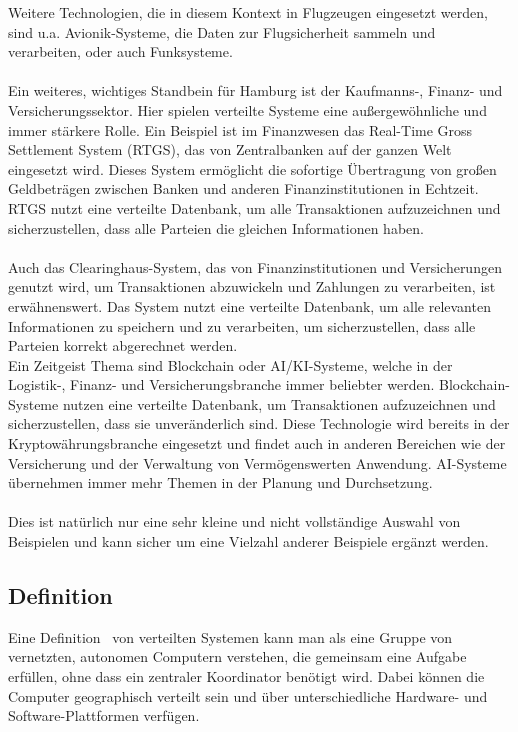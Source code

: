 \documentclass[../vs-script-first-v01.tex]{subfiles}
\begin{document}
Weitere Technologien, die in diesem Kontext in Flugzeugen eingesetzt werden, sind u.a. Avionik-Systeme, die Daten zur Flugsicherheit sammeln und verarbeiten, oder auch Funksysteme.
\\\\
Ein weiteres, wichtiges Standbein für Hamburg ist der Kaufmanns-, Finanz- und Versicherungssektor. Hier spielen verteilte Systeme eine außergewöhnliche und immer stärkere Rolle. Ein Beispiel ist im Finanzwesen das Real-Time Gross Settlement System (RTGS)\cite{rtgs}, das von Zentralbanken auf der ganzen Welt eingesetzt wird. Dieses System ermöglicht die sofortige Übertragung von großen Geldbeträgen zwischen Banken und anderen Finanzinstitutionen in Echtzeit. RTGS nutzt eine verteilte Datenbank, um alle Transaktionen aufzuzeichnen und sicherzustellen, dass alle Parteien die gleichen Informationen haben.
\\\\
Auch das Clearinghaus-System\cite{clearinghouse}, das von Finanzinstitutionen und Versicherungen genutzt wird, um Transaktionen abzuwickeln und Zahlungen zu verarbeiten, ist erwähnenswert. Das System nutzt eine verteilte Datenbank, um alle relevanten Informationen zu speichern und zu verarbeiten, um sicherzustellen, dass alle Parteien korrekt abgerechnet werden.
\\
Ein Zeitgeist Thema sind Blockchain\cite{blockchain} oder AI/KI-Systeme, welche in der Logistik-, Finanz- und Versicherungsbranche immer beliebter werden. Blockchain-Systeme nutzen eine verteilte Datenbank, um Transaktionen aufzuzeichnen und sicherzustellen, dass sie unveränderlich sind. Diese Technologie wird bereits in der Kryptowährungsbranche eingesetzt und findet auch in anderen Bereichen wie der Versicherung und der Verwaltung von Vermögenswerten Anwendung. AI-Systeme übernehmen immer mehr Themen in der Planung und Durchsetzung.
\\\\
Dies ist natürlich nur eine sehr kleine und nicht vollständige Auswahl von Beispielen und kann sicher um eine Vielzahl anderer Beispiele ergänzt werden. \subsection{Definition}

Eine Definition~\cite{coulouris2012distributed} von verteilten Systemen kann man als eine Gruppe von vernetzten, autonomen Computern verstehen, die gemeinsam eine Aufgabe erfüllen, ohne dass ein zentraler Koordinator benötigt wird. Dabei können die Computer geographisch verteilt sein und über unterschiedliche Hardware- und Software-Plattformen verfügen.
\end{document}
